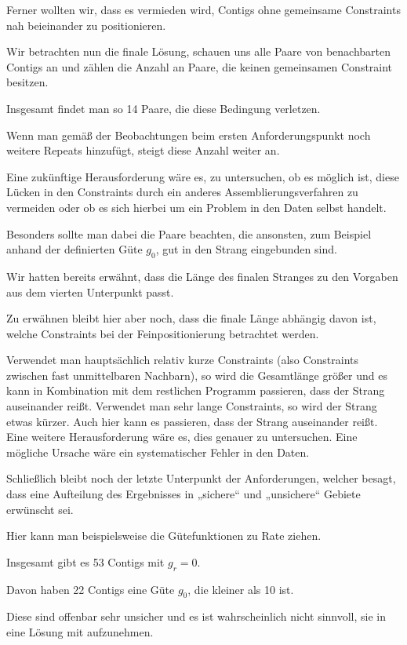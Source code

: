 Ferner wollten wir, dass es vermieden wird, Contigs ohne gemeinsame Constraints nah beieinander zu positionieren.

Wir betrachten nun die finale Lösung, schauen uns alle Paare von benachbarten Contigs an und zählen die Anzahl an Paare, die keinen gemeinsamen Constraint besitzen.

Insgesamt findet man so 14 Paare, die diese Bedingung verletzen.

Wenn man gemäß der Beobachtungen beim ersten Anforderungspunkt noch weitere Repeats hinzufügt, steigt diese Anzahl weiter an.

Eine zukünftige Herausforderung wäre es, zu untersuchen, ob es möglich ist, diese Lücken in den Constraints durch ein anderes Assemblierungsverfahren zu vermeiden oder ob es sich hierbei um ein Problem in den Daten selbst handelt.

Besonders sollte man dabei die Paare beachten, die ansonsten, zum Beispiel anhand der definierten Güte $g_0$, gut in den Strang eingebunden sind.


Wir hatten bereits erwähnt, dass die Länge des finalen Stranges zu den Vorgaben aus dem vierten Unterpunkt passt.

Zu erwähnen bleibt hier aber noch, dass die finale Länge abhängig davon ist, welche Constraints bei der Feinpositionierung betrachtet werden.


Verwendet man hauptsächlich relativ kurze Constraints (also Constraints zwischen fast unmittelbaren Nachbarn), so wird die Gesamtlänge größer und es kann in Kombination mit dem restlichen Programm passieren, dass der Strang auseinander reißt. Verwendet man sehr lange Constraints, so wird der Strang etwas kürzer. Auch hier kann es passieren, dass der Strang auseinander reißt. Eine weitere Herausforderung wäre es, dies genauer zu untersuchen. Eine mögliche Ursache wäre ein systematischer Fehler in den Daten.

Schließlich bleibt noch der letzte Unterpunkt der Anforderungen, welcher besagt, dass eine Aufteilung des Ergebnisses in „sichere“ und „unsichere“ Gebiete erwünscht sei.

Hier kann man beispielsweise die Gütefunktionen zu Rate ziehen.


Insgesamt gibt es 53 Contigs mit $g_r = 0$.

Davon haben 22 Contigs eine Güte $g_0$, die kleiner als 10 ist.

Diese sind offenbar sehr unsicher und es ist wahrscheinlich nicht sinnvoll, sie in eine Lösung mit aufzunehmen. 

